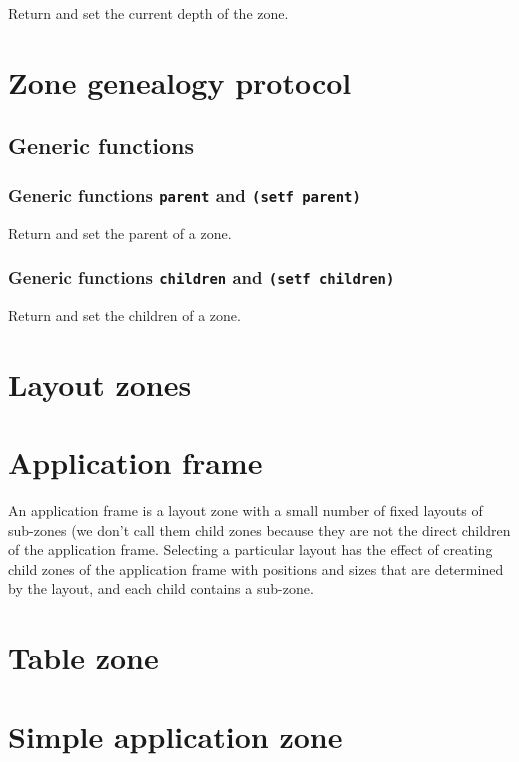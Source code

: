 \documentclass{report}
\begin{document}
Return and set the current depth of the zone.

\section{Zone genealogy protocol}

\subsection{Generic functions}

\subsubsection{Generic functions \texttt{parent} and \texttt{(setf parent)}}

Return and set the parent of a zone.

\subsubsection{Generic functions \texttt{children} and \texttt{(setf children)}}

Return and set the children of a zone.

\section{Layout zones}

\section{Application frame}

An application frame is a layout zone with a small number of fixed
layouts of sub-zones (we don't call them child zones because they
are not the direct children of the application frame.  Selecting a
particular layout has the effect of creating child zones of the
application frame with positions and sizes that are determined by the
layout, and each child contains a sub-zone.

\section{Table zone}

\section{Simple application zone}
\end{document}
